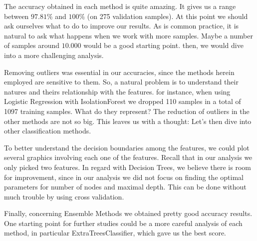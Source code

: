 \documentclass[a4paper,11pt]{amsart}
\begin{document}
The accuracy obtained in each method is quite amazing. It gives us a range between $97.81\%$ and $100\%$ (on 275 validation samples). At this point we should ask ourselves what to do to improve our results. As is common practice, it is natural to ask what happens when we work with more samples. Maybe a number of samples around $10.000$ would be a good starting point. then, we would dive into a more challenging analysis.

\medbreak

Removing outliers was essential in our accuracies, since the methods herein employed are sensitive to them. So, a natural problem is to understand their natures and theirs relationship with the features. for instance, when using Logistic Regression with IsolationForest we dropped 110 samples in a total of 1097 training samples. What do they represent? The reduction of outliers in the other methods are not so big. This leaves us with a thought: Let's then dive into other classification methods. 

\medbreak

To better understand the decision boundaries among the features, we could plot several graphics involving each one of the features. Recall that in our analysis we only picked two features. In regard with Decision Trees, we believe there is room for improvement, since in our analysis we did not focus on finding the optimal parameters for number of nodes and maximal depth. This can be done without much trouble by using cross validation.

\medbreak

Finally, concerning Ensemble Methods we obtained pretty good accuracy results. One starting point for further studies could be a more careful analysis of each method, in particular ExtraTreesClassifier, which gave us the best score. 
\end{document}
